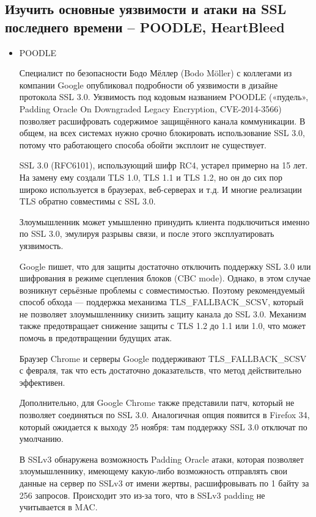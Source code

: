 \documentclass[11pt, a4paper]{article}		%
\begin{document}

\subsection{Изучить основные уязвимости и атаки на SSL последнего времени – POODLE, HeartBleed}

\begin{itemize}

\item POODLE 

Специалист по безопасности Бодо Мёллер (Bodo Möller) с коллегами из компании Google опубликовал подробности об уязвимости в дизайне протокола SSL 3.0. Уязвимость под кодовым названием POODLE («пудель», Padding Oracle On Downgraded Legacy Encryption, CVE-2014-3566) позволяет расшифровать содержимое защищённого канала коммуникации. В общем, на всех системах нужно срочно блокировать использование SSL 3.0, потому что работающего способа обойти эксплоит не существует.

SSL 3.0 (RFC6101), использующий шифр RC4, устарел примерно на 15 лет. На замену ему создали TLS 1.0, TLS 1.1 и TLS 1.2, но он до сих пор широко используется в браузерах, веб-серверах и т.д. И многие реализации TLS обратно совместимы с SSL 3.0.

Злоумышленник может умышленно принудить клиента подключиться именно по SSL 3.0, эмулируя разрывы связи, и после этого эксплуатировать уязвимость.

Google пишет, что для защиты достаточно отключить поддержку SSL 3.0 или шифрования в режиме сцепления блоков (CBC mode). Однако, в этом случае возникнут серьёзные проблемы с совместимостью. Поэтому рекомендуемый способ обхода — поддержка механизма TLS\_FALLBACK\_SCSV, который не позволяет злоумышленнику снизить защиту канала до SSL 3.0. Механизм также предотвращает снижение защиты с TLS 1.2 до 1.1 или 1.0, что может помочь в предотвращении будущих атак.

Браузер Chrome и серверы Google поддерживают TLS\_FALLBACK\_SCSV с февраля, так что есть достаточно доказательств, что метод действительно эффективен.

Дополнительно, для Google Chrome также представили патч, который не позволяет соединяться по SSL 3.0. Аналогичная опция появится в Firefox 34, который ожидается к выходу 25 ноября: там поддержку SSL 3.0 отключат по умолчанию.

В SSLv3 обнаружена возможность Padding Oracle атаки, которая позволяет злоумышленнику, имеющему какую-либо возможность отправлять свои данные на сервер по SSLv3 от имени жертвы, расшифровывать по 1 байту за 256 запросов. Происходит это из-за того, что в SSLv3 padding не учитывается в MAC.


\end{itemize}
\end{document}
